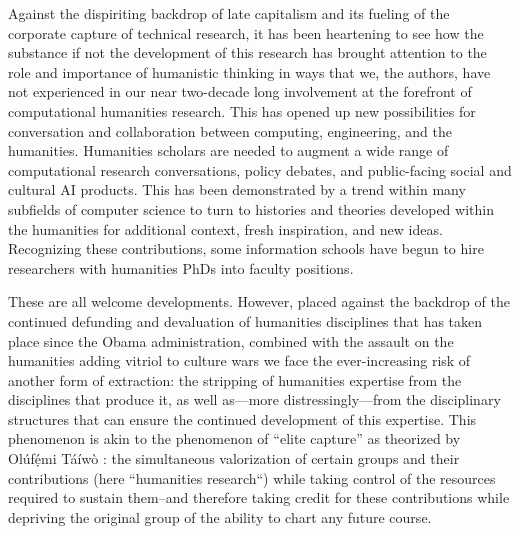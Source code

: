 Against the dispiriting backdrop of late capitalism and its fueling of the corporate capture of technical research, it has been heartening to see how the substance if not the development of this research has brought attention to the role and importance of humanistic thinking in ways that we, the authors, have not experienced in our near two-decade long involvement at the forefront of computational humanities research. This has opened up new possibilities for conversation and collaboration between computing, engineering, and the humanities. Humanities scholars are needed to augment a wide range of computational research conversations, policy debates, and public-facing social and cultural AI products. This has been demonstrated  by a trend within many subfields of computer science to turn to histories and theories developed within the humanities for additional context, fresh inspiration, and new ideas. Recognizing these contributions, some information schools have begun to hire researchers with humanities PhDs into faculty positions.  

These are all welcome developments. However, placed against the backdrop of the continued defunding and devaluation of humanities disciplines that has taken place since the Obama administration, combined with the assault on the humanities adding vitriol to culture wars we face the ever-increasing risk of another form of extraction: the stripping of humanities expertise from the disciplines that produce it, as well as---more distressingly---from the disciplinary structures that can ensure the continued development of this expertise. This phenomenon is akin to the phenomenon of ``elite capture'' as theorized by 
Ol\'uf\d{\'e}mi T\'a\'iw\`o \cite{taiwo_elite_2022}: the simultaneous valorization of certain groups and their contributions (here ``humanities research``) while taking control of the resources required to sustain them–and therefore taking credit for these contributions while depriving the original group of the ability to chart any future course. 

